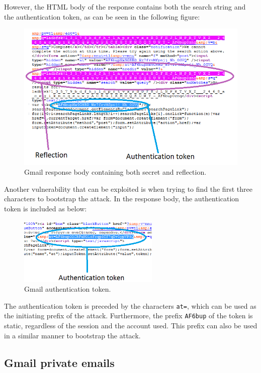 However, the HTML body of the response contains both the search string and the
authentication token, as can be seen in the following figure:

\begin{figure}[H] \caption{Gmail response body containing both secret and
reflection.} \centering
\includegraphics[width=1\textwidth]{diagrams/gmail_response.png}\end{figure}

Another vulnerability that can be exploited is when trying to find the first
three characters to bootstrap the attack. In the response body, the
authentication token is included as below:

\begin{figure}[H] \caption{Gmail authentication token.} \centering
\includegraphics[width=0.6\textwidth]{diagrams/gmail_bootstrap.png}\end{figure}

The authentication token is preceded by the characters \texttt{at=}, which can
be used as the initiating prefix of the attack. Furthermore, the prefix
\texttt{AF6bup} of the token is static, regardless of the session and the
account used. This prefix can also be used in a similar manner to bootstrap the
attack.

\subsection{Gmail private emails}\label{subsec:gmail_mail}

